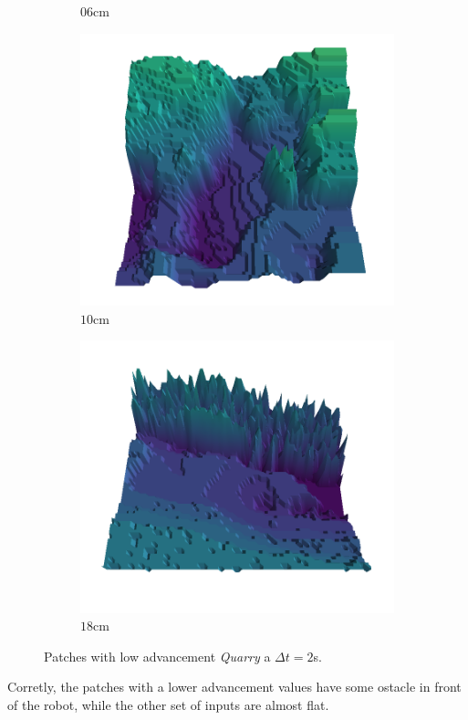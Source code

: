 \documentclass[../document.tex]{subfiles}
\begin{document}
\begin{figure}[H]
\begin{subfigure}[b]{0.19\textwidth}
        \caption{$06$cm}
        \end{subfigure}
        \begin{subfigure}[b]{0.19\textwidth}
        \includegraphics[width=\linewidth]{../img/5/quarry/all/worst/10-patch-3d-majavi-colormap-8.png}
        \caption{$10$cm}
        \end{subfigure}
        \begin{subfigure}[b]{0.19\textwidth}
        \includegraphics[width=\linewidth]{../img/5/quarry/all/worst/18-patch-3d-majavi-colormap-9.png}
        \caption{$18$cm}
        \end{subfigure}
        \caption{Patches with low advancement \emph{Quarry} a $\Delta t = 2$s.}
    \end{figure}
Corretly, the patches with a lower advancement values have some ostacle in front of the robot, while the other set of inputs are almost flat.
\end{document}
